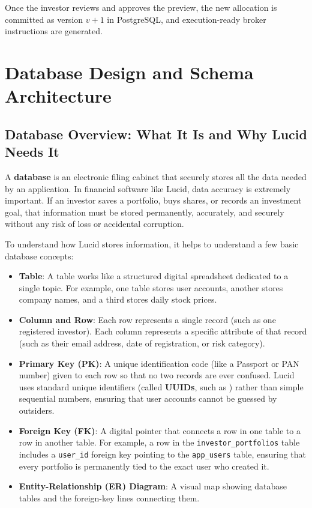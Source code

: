 Once the investor reviews and approves the preview, the new allocation is committed as version $v+1$ in PostgreSQL, and execution-ready broker instructions are generated.

\section{Database Design and Schema Architecture}
\label{sec:database_design}

\subsection{Database Overview: What It Is and Why Lucid Needs It}
A \textbf{database} is an electronic filing cabinet that securely stores all the data needed by an application. In financial software like Lucid, data accuracy is extremely important. If an investor saves a portfolio, buys shares, or records an investment goal, that information must be stored permanently, accurately, and securely without any risk of loss or accidental corruption.

To understand how Lucid stores information, it helps to understand a few basic database concepts:
\begin{itemize}
    \item \textbf{Table}: A table works like a structured digital spreadsheet dedicated to a single topic. For example, one table stores user accounts, another stores company names, and a third stores daily stock prices.
    \item \textbf{Column and Row}: Each row represents a single record (such as one registered investor). Each column represents a specific attribute of that record (such as their email address, date of registration, or risk category).
    \item \textbf{Primary Key (PK)}: A unique identification code (like a Passport or PAN number) given to each row so that no two records are ever confused. Lucid uses standard unique identifiers (called \textbf{UUIDs}, such as ) rather than simple sequential numbers, ensuring that user accounts cannot be guessed by outsiders.
    \item \textbf{Foreign Key (FK)}: A digital pointer that connects a row in one table to a row in another table. For example, a row in the \texttt{investor\_portfolios} table includes a \texttt{user\_id} foreign key pointing to the \texttt{app\_users} table, ensuring that every portfolio is permanently tied to the exact user who created it.
    \item \textbf{Entity-Relationship (ER) Diagram}: A visual map showing database tables and the foreign-key lines connecting them.
\end{itemize}

